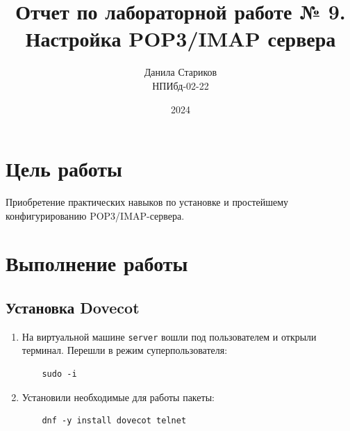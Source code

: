 

\title{Отчет по лабораторной работе № 9. \\Настройка POP3/IMAP сервера}
\author{Данила Стариков \\ НПИбд-02-22}
\date{2024}


\maketitle
\newpage

\tableofcontents

\newpage
\section{Цель работы}
Приобретение практических навыков по установке и простейшему конфигурированию POP3/IMAP-сервера.
\newpage
\section{Выполнение работы}

\subsection{Установка Dovecot}
\begin{enumerate}
\item На виртуальной машине \texttt{server} вошли под пользователем и открыли терминал. Перешли в режим суперпользователя:
  \begin{verbatim}
    sudo -i
  \end{verbatim}
\item Установили необходимые для работы пакеты:
  \begin{verbatim}
    dnf -y install dovecot telnet
  \end{verbatim}
\end{enumerate}
